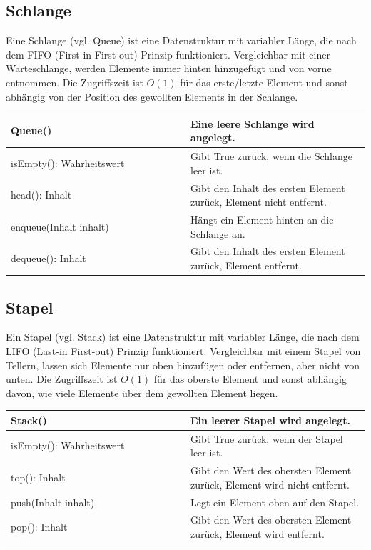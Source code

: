 \subsection{Schlange}

Eine Schlange (vgl. Queue) ist eine Datenstruktur mit variabler Länge, die nach dem
FIFO (First-in First-out) Prinzip funktioniert. Vergleichbar mit einer Warteschlange,
werden Elemente immer hinten hinzugefügt und von vorne entnommen. Die Zugriffszeit ist
$O(1)$ für das erste/letzte Element und sonst abhängig von der Position des gewollten
Elements in der Schlange.

\begin{table}[H]
    \begin{tabular}{|p{0.5\linewidth}|p{0.5\linewidth}|}
    \hline
    Queue() & Eine leere Schlange wird angelegt. \\ \hline
    isEmpty(): Wahrheitswert & Gibt True zurück, wenn die Schlange leer ist. \\ \hline
    head(): Inhalt & Gibt den Inhalt des ersten Element zurück, Element nicht entfernt. \\ \hline
    enqueue(Inhalt inhalt) & Hängt ein Element hinten an die Schlange an. \\ \hline
    dequeue(): Inhalt & Gibt den Inhalt des ersten Element zurück, Element entfernt. \\ \hline
    \end{tabular}
\end{table}

\subsection{Stapel}

Ein Stapel (vgl. Stack) ist eine Datenstruktur mit variabler Länge, die nach dem
LIFO (Last-in First-out) Prinzip funktioniert. Vergleichbar mit einem Stapel von Tellern,
lassen sich Elemente nur oben hinzufügen oder entfernen, aber nicht von unten.
Die Zugriffszeit ist $O(1)$ für das oberste Element und sonst abhängig davon, wie viele
Elemente über dem gewollten Element liegen.

\begin{table}[H]
    \begin{tabular}{|p{0.5\linewidth}|p{0.5\linewidth}|}
    \hline
    Stack() & Ein leerer Stapel wird angelegt. \\ \hline
    isEmpty(): Wahrheitswert & Gibt True zurück, wenn der Stapel leer ist. \\ \hline
    top(): Inhalt & Gibt den Wert des obersten Element zurück, Element wird nicht entfernt. \\ \hline
    push(Inhalt inhalt) & Legt ein Element oben auf den Stapel. \\ \hline
    pop(): Inhalt & Gibt den Wert des obersten Element zurück, Element wird entfernt.  \\ \hline
    \end{tabular}
\end{table}

